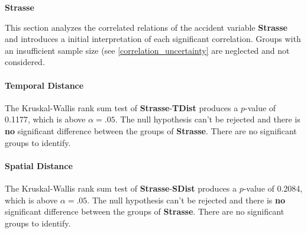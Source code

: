 \Large
\centerline{\textbf{Strasse}}
\normalsize
This section analyzes the correlated relations of the accident variable \textbf{Strasse} and introduces a initial interpretation of each significant correlation. Groups with an insufficient sample size (see \cref{correlation_uncertainty} are neglected and not considered.


\paragraph{Temporal Distance}
The Kruskal-Wallis rank sum test of \textbf{Strasse}-\textbf{TDist} produces a $p$-value of 0.1177, which is above $\alpha=.05$. The null hypothesis can't be rejected and there is \textbf{no} significant difference between the groups of \textbf{Strasse}. There are no significant groups to identify.

\paragraph{Spatial Distance}
The Kruskal-Wallis rank sum test of \textbf{Strasse}-\textbf{SDist} produces a $p$-value of 0.2084, which is above $\alpha=.05$. The null hypothesis can't be rejected and there is \textbf{no} significant difference between the groups of \textbf{Strasse}. There are no significant groups to identify.






